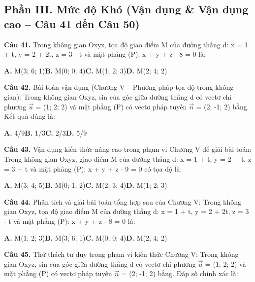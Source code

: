 \documentclass[11pt,a4paper]{article}
\begin{document}
\subsection*{\color{accent} Phần III. Mức độ Khó (Vận dụng \& Vận dụng cao -- Câu 41 đến Câu 50)}
\textbf{\color{primary} Câu 41.} Trong không gian Oxyz, tọa độ giao điểm M của đường thẳng d: x = 1 + t, y = 2 + 2t, z = 3 - t và mặt phẳng (P): x + y + z - 8 = 0 là:\par
\hspace*{1.5em}\textbf{A.} M(3; 6; 1)\quad\quad \textbf{B.} M(0; 0; 4)\quad\quad \textbf{C.} M(1; 2; 3)\quad\quad \textbf{D.} M(2; 4; 2)\par\vspace{2pt}
\textbf{\color{primary} Câu 42.} Bài toán vận dụng (Chương V – Phương pháp tọa độ trong không gian): Trong không gian Oxyz, sin của góc giữa đường thẳng d có vectơ chỉ phương $\vec{u}$ = (1; 2; 2) và mặt phẳng (P) có vectơ pháp tuyến $\vec{n}$ = (2; -1; 2) bằng. Kết quả đúng là:\par
\hspace*{1.5em}\textbf{A.} 4/9\quad\quad \textbf{B.} 1/3\quad\quad \textbf{C.} 2/3\quad\quad \textbf{D.} 5/9\par\vspace{2pt}
\textbf{\color{primary} Câu 43.} Vận dụng kiến thức nâng cao trong phạm vi Chương V để giải bài toán: Trong không gian Oxyz, giao điểm M của đường thẳng d: x = 1 + t, y = 2 + t, z = 3 + t và mặt phẳng (P): x + y + z - 9 = 0 có tọa độ là:\par
\hspace*{1.5em}\textbf{A.} M(3; 4; 5)\quad\quad \textbf{B.} M(0; 1; 2)\quad\quad \textbf{C.} M(2; 3; 4)\quad\quad \textbf{D.} M(1; 2; 3)\par\vspace{2pt}
\textbf{\color{primary} Câu 44.} Phân tích và giải bài toán tổng hợp sau của Chương V: Trong không gian Oxyz, tọa độ giao điểm M của đường thẳng d: x = 1 + t, y = 2 + 2t, z = 3 - t và mặt phẳng (P): x + y + z - 8 = 0 là:\par
\hspace*{1.5em}\textbf{A.} M(1; 2; 3)\quad\quad \textbf{B.} M(3; 6; 1)\quad\quad \textbf{C.} M(0; 0; 4)\quad\quad \textbf{D.} M(2; 4; 2)\par\vspace{2pt}
\textbf{\color{primary} Câu 45.} Thử thách tư duy trong phạm vi kiến thức Chương V: Trong không gian Oxyz, sin của góc giữa đường thẳng d có vectơ chỉ phương $\vec{u}$ = (1; 2; 2) và mặt phẳng (P) có vectơ pháp tuyến $\vec{n}$ = (2; -1; 2) bằng. Đáp số chính xác là:\par
\end{document}
